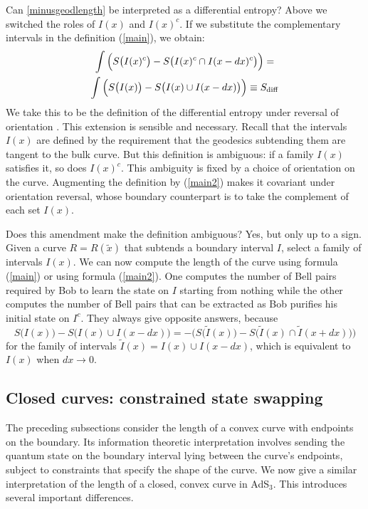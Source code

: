\documentclass[12pt]{article}
\def\sdiff{S_{\rm diff}}
\begin{document}
Can \eqref{minusgeodlength} be interpreted as a differential entropy? Above we switched the roles of $I(x)$ and $I(x)^c$. If we substitute the complementary intervals in the definition (\ref{main}), we obtain:
\begin{multline}
\int \Big(S\big(I(x)^c\big) - S\big(I(x)^c \cap I(x-dx)^c\big) \Big) = \\
\int \Big(S\big(I(x)\big) - S\big(I(x) \cup I(x-dx)\big) \Big) \equiv \sdiff
\label{main2}
\end{multline}
We take this to be the definition of the differential entropy under reversal of orientation \cite{roblast, robproof, lampros}. This extension is sensible and necessary. Recall that the intervals $I(x)$ are defined by the requirement that the geodesics subtending them are tangent to the bulk curve. But this definition is ambiguous: if a family $I(x)$ satisfies it, so does $I(x)^c$. This ambiguity is fixed by a choice of orientation on the curve. Augmenting the definition by (\ref{main2}) makes it covariant under orientation reversal, whose boundary counterpart is to take the complement of each set $I(x)$.

Does this amendment make the definition ambiguous? Yes, but only up to a sign. Given a curve $R = R(\tilde{x})$ that subtends a boundary interval $I$, select a family of intervals $I(x)$. We can now compute the length of the curve using formula (\ref{main}) or using formula (\ref{main2}). One computes the number of Bell pairs required by Bob to learn the state on $I$ starting from nothing while the other computes the number of Bell pairs that can be extracted as Bob purifies his initial state on $I^c$. They always give opposite answers, because
\begin{equation}
S\big(I(x)\big) - S\big(I(x) \cup I(x-dx)\big) = - \Big( S\big(\tilde{I}(x)\big) - S\big( \tilde{I}(x) \cap \tilde{I}(x+dx) \big) \Big)
\label{sumdiff}
\end{equation}
for the family of intervals $\tilde{I}(x) = I(x) \cup I(x-dx)$, which is equivalent to $I(x)$ when $dx \to 0$.

\subsection{Closed curves: constrained state swapping}
\label{swapprotocol}
The preceding subsections consider the length of a convex curve with endpoints on the boundary. Its information theoretic interpretation involves sending the quantum state on the boundary interval lying between the curve's endpoints, subject to constraints that specify the shape of the curve. We now give a similar interpretation of the length of a closed, convex curve in AdS$_3$. This introduces several important differences.
\end{document}
